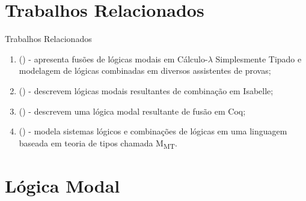\documentclass[xcolor=table]{beamer}
\begin{document}
    \section[]{Trabalhos Relacionados}
    \begin{frame}{Trabalhos Relacionados}
        \begin{enumerate}
            \item {} (\citeyear{benzmuller2010combining}) -
                apresenta fusões de lógicas modais em Cálculo-\(\lambda\) Simplesmente Tipado e modelagem de lógicas combinadas em diversos assistentes de provas;
            \item {} (\citeyear{fuenmayor2019mechanised}) -
                descrevem lógicas modais resultantes de combinação em Isabelle;
            \item {} (\citeyear{lescanne2007dynamic}) -
                descrevem uma lógica modal resultante de fusão em Coq;
            \item {} (\citeyear{rabe2017identify}) -
                modela sistemas lógicos e combinações de lógicas em uma linguagem baseada em teoria de tipos chamada M\textsubscript{MT}.
        \end{enumerate}
    \end{frame}

    \section[]{Lógica Modal}
\end{document}
